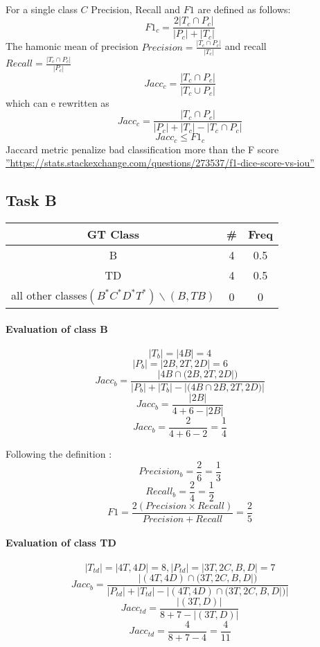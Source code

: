 \documentclass[10pt]{article}
\begin{document}
\paragraph{}
For a single class $C$ Precision, Recall and  $F1$ are defined as follows:
 $$F1_c =\frac{2|{T_c}\cap{P_c}|}{|P_c|+|T_c|}$$
 The hamonic mean of precision $Precision =\frac{|{T_c}\cap{P_c}|}{|T_c|}$ and recall\\$Recall =\frac{|{T_c}\cap{P_c}|}{|P_c|}$
 $$Jacc_c =\frac{|{T_c}\cap{P_c}|}{|{T_c}\cup{P_c}|}$$
 which can e rewritten as
 $$Jacc_c =\frac{|{T_c}\cap{P_c}|}{|P_c|+|T_c|-|{T_c}\cap{P_c}|}$$
 $$Jacc_c\leq{F1_c}$$
Jaccard metric penalize bad classification more than the F score \hyperref[besteval]{''https://stats.stackexchange.com/questions/273537/f1-dice-score-vs-iou''}


\subsection{Task B}
\begin{center}
\begin{tabular}{ c c c }
 GT Class & \# & Freq  \\
 \hline
 B & 4 &  0.5  \\ 
 TD & 4 & 0.5   \\ 
 all other classes$(B^*C^*D^*T^*)\backslash (B,TB)$ & 0 & 0 
\end{tabular}
\end{center}
\paragraph{Evaluation of class B}
$$|T_b| = |4B| = 4 $$ 
$$|P_b| = |2B,2T,2D| = 6$$
$$Jacc_b = \frac{|4B\cap{(2B,2T,2D}|)}{|P_b|+|T_b|-|(4B\cap{2B,2T,2D)}|}$$
$$Jacc_b = \frac{|2B|}{4+6-|2B|}$$
$$Jacc_b = \frac{2}{4+6-2} = \frac{1}{4}$$

Following the definition :
$$Precision_b = \frac{2}{6} = \frac{1}{3}$$
$$Recall_b = \frac{2}{4} = \frac{1}{2}$$
$$F1 = \frac{2(Precision\times Recall)}{Precision + Recall} = \frac{2}{5}$$

\paragraph{Evaluation of class TD}  
$$|T_{td}| = |4T,4D| = 8, |P_{td}| = |3T,2C,B,D| = 7$$
$$Jacc_b = \frac{|(4T,4D)\cap{(3T,2C,B,D}|)}{|P_{td}|+|T_{td}|-|(4T,4D)\cap{(3T,2C,B,D}|)|}$$
$$Jacc_{td} = \frac{|(3T,D)|}{8+7-|(3T,D)|}$$
$$Jacc_{td} = \frac{4}{8+7-4} = \frac{4}{11}$$
\end{document}
